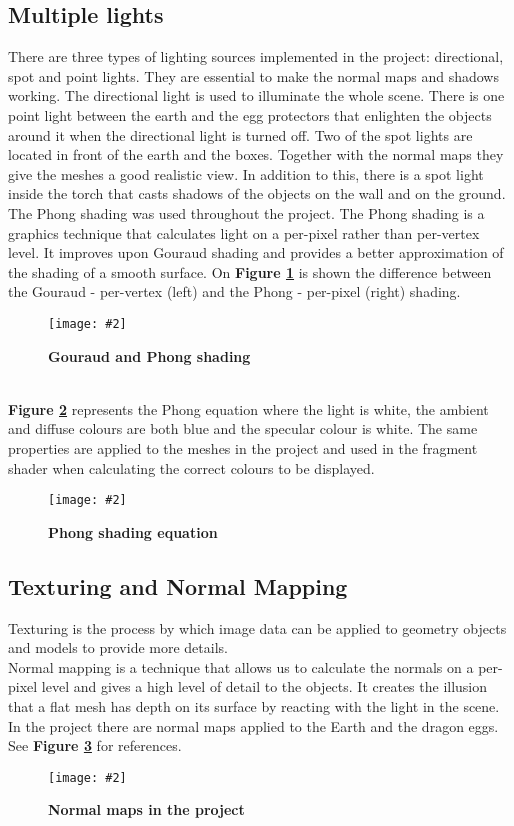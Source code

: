 \documentclass[10pt, a4paper]{article}
\newcommand{\figuremacro}[5]{
    \begin{figure}[#1]
        \centering
        \texttt{[image: \#2]}
        \caption[#3]{\textbf{#3}#4}
        \label{fig:#2}
    \end{figure}
}
\begin{document}
	\subsection{Multiple lights}
	There are three types of lighting sources implemented in the project: directional, spot and point lights. They are essential to make the normal maps and shadows working. The directional light is used to illuminate the whole scene. There is one point light between the earth and the egg protectors that enlighten the objects around it when the directional light is turned off. Two of the spot lights are located in front of the earth and the boxes. Together with the normal maps they give the meshes a good realistic view. In addition to this, there is a spot light inside the torch that casts shadows of the objects on the wall and on the ground. 
	\\The Phong shading was used throughout the project. The Phong shading is a graphics technique that calculates light on a per-pixel rather than per-vertex level. It improves upon Gouraud shading and provides a better approximation of the shading of a smooth surface. On \textbf{Figure {\ref{fig:phongAndGouraud}}} is shown the difference between the Gouraud - per-vertex (left) and the Phong - per-pixel (right) shading.
	\figuremacro{h}{phongAndGouraud}{Gouraud and Phong shading}{ }{1.0}	
	\\
	\textbf{Figure {\ref{fig:phongEquation}}} represents the Phong equation where the light is white, the ambient and diffuse colours are both blue and the specular colour is white. The same properties are applied to the meshes in the project and used in the fragment shader when calculating the correct colours to be displayed.
	\figuremacro{h}{phongEquation}{Phong shading equation}{ }{1.0}		
	
	\subsection{Texturing and Normal Mapping}
	Texturing is the process by which image data can be applied to geometry objects and models to provide more details. 
    \\Normal mapping is a technique that allows us to calculate the normals on a per-pixel level and gives a high level of detail to the objects. It creates the illusion that a flat mesh has depth on its surface by reacting with the light in the scene. In the project there are normal maps applied to the Earth and the dragon eggs. See \textbf{Figure {\ref{fig:normalMaps}}} for references.
   	\figuremacro{h}{normalMaps}{Normal maps in the project}{ }{1.0}	
   	
\end{document}
